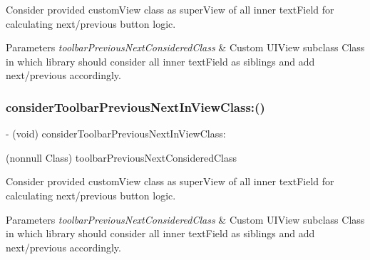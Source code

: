 Consider provided custom\+View class as super\+View of all inner text\+Field for calculating next/previous button logic.


\begin{DoxyParams}{Parameters}
{\em toolbar\+Previous\+Next\+Considered\+Class} & Custom U\+I\+View subclass Class in which library should consider all inner text\+Field as siblings and add next/previous accordingly. \\
\hline
\end{DoxyParams}
\mbox{\label{interface_i_q_keyboard_manager_a2d970d5680770d6aaced62a822b31958}} 
\subsubsection{\texorpdfstring{consider\+Toolbar\+Previous\+Next\+In\+View\+Class\+:()}{considerToolbarPreviousNextInViewClass:()}\hspace{0.1cm}{\footnotesize\ttfamily [2/3]}}
{\footnotesize\ttfamily -\/ (void) consider\+Toolbar\+Previous\+Next\+In\+View\+Class\+: \begin{DoxyParamCaption}\item[{(nonnull Class)}]{toolbar\+Previous\+Next\+Considered\+Class }\end{DoxyParamCaption}}

Consider provided custom\+View class as super\+View of all inner text\+Field for calculating next/previous button logic.


\begin{DoxyParams}{Parameters}
{\em toolbar\+Previous\+Next\+Considered\+Class} & Custom U\+I\+View subclass Class in which library should consider all inner text\+Field as siblings and add next/previous accordingly. \\
\hline
\end{DoxyParams}
\mbox{\label{interface_i_q_keyboard_manager_a2d970d5680770d6aaced62a822b31958}} 
